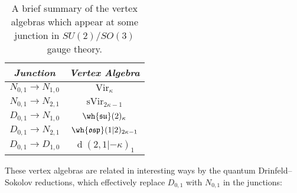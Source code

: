\documentclass[11pt,reqno]{amsart}
\theoremstyle{plain}
\numberwithin{equation}{section}
\DeclareMathOperator{\Vir}{Vir}
\DeclareMathOperator{\sVir}{sVir}
\DeclareMathOperator{\td}{d}
\theoremstyle{definition}
\begin{document}
\begin{table}[h]
\begin{center}
\begin{tabular}{|c||c|}
\hline
{\em Junction} & {\em Vertex Algebra}  \\
\hline \hline
$N_{0,1} \to N_{1,0}$& $\Vir_\kappa$  \\ 
\hline
$N_{0,1} \to N_{2,1}$ & $\sVir_{2 \kappa-1}$  \\
\hline
$D_{0,1} \to N_{1,0}$& $\wh{\mathfrak{su}}(2)_{\kappa}$ \\
\hline
$D_{0,1} \to N_{2,1}$& $\wh{\mathfrak{osp}}(1|2)_{2\kappa-1}$  \\
\hline
$D_{0,1} \to D_{1,0}$& $\td(2,1|-\kappa)_1$  \\
\hline
\end{tabular} 
\end{center}
\vspace*{5mm}
\caption{A brief summary of the vertex algebras which appear at some junction in $SU(2)/SO(3)$ gauge theory.}\label{tab:three}
\end{table}

These vertex algebras are related in interesting ways by the quantum
Drinfeld--Sokolov reductions, which effectively replace $D_{0,1}$ with
$N_{0,1}$ in the junctions:

\medskip
\end{document}

